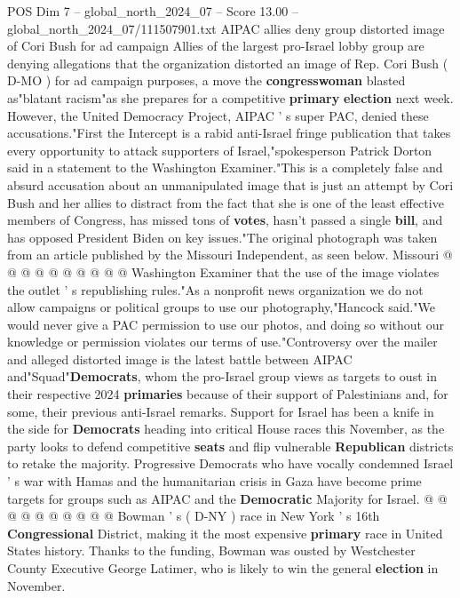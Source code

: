 \begin{textsample}{POS Dim 7 – global\_north\_2024\_07 – Score 13.00 – global\_north\_2024\_07/111507901.txt}  \label{ex:f7_pos_044}
AIPAC allies deny group distorted image of Cori Bush for ad campaign Allies of the largest pro-Israel lobby group are denying allegations that the organization distorted an image of Rep.
Cori Bush ( D-MO ) for ad campaign purposes, a move the \textbf{congresswoman} blasted as"blatant racism"as she prepares for a competitive \textbf{primary} \textbf{election} next week.
However, the United Democracy Project, AIPAC ' s super PAC, denied these accusations."First the Intercept is a rabid anti-Israel fringe publication that takes every opportunity to attack supporters of Israel,"spokesperson Patrick Dorton said in a statement to the Washington Examiner."This is a completely false and absurd accusation about an unmanipulated image that is just an attempt by Cori Bush and her allies to distract from the fact that she is one of the least effective members of Congress, has missed tons of \textbf{votes}, hasn't passed a single \textbf{bill}, and has opposed President Biden on key issues."The original photograph was taken from an article published by the Missouri Independent, as seen below.
Missouri @ @ @ @ @ @ @ @ @ @ Washington Examiner that the use of the image violates the outlet ' s republishing rules."As a nonprofit news organization we do not allow campaigns or political groups to use our photography,"Hancock said."We would never give a PAC permission to use our photos, and doing so without our knowledge or permission violates our terms of use."Controversy over the mailer and alleged distorted image is the latest battle between AIPAC and"Squad"\textbf{Democrats}, whom the pro-Israel group views as targets to oust in their respective 2024 \textbf{primaries} because of their support of Palestinians and, for some, their previous anti-Israel remarks.
Support for Israel has been a knife in the side for \textbf{Democrats} heading into critical House races this November, as the party looks to defend competitive \textbf{seats} and flip vulnerable \textbf{Republican} districts to retake the majority.
Progressive Democrats who have vocally condemned Israel ' s war with Hamas and the humanitarian crisis in Gaza have become prime targets for groups such as AIPAC and the \textbf{Democratic} Majority for Israel. @ @ @ @ @ @ @ @ @ @ Bowman ' s ( D-NY ) race in New York ' s 16th \textbf{Congressional} District, making it the most expensive \textbf{primary} race in United States history.
Thanks to the funding, Bowman was ousted by Westchester County Executive George Latimer, who is likely to win the general \textbf{election} in November.

\end{textsample}
